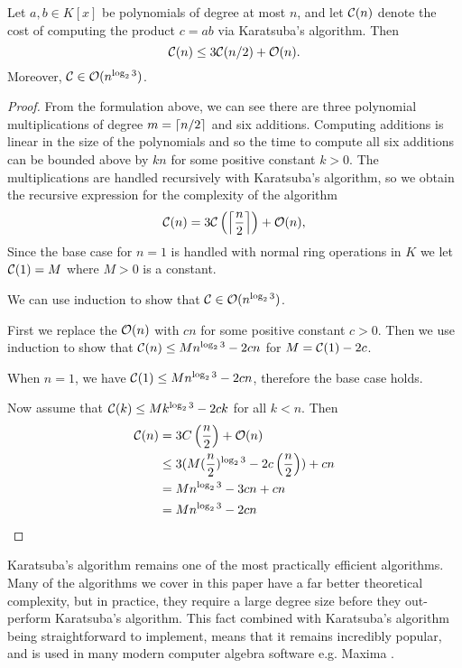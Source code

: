 \begin{theorem}
    
    Let $a, b \in K[x]$ be polynomials of degree at most $n$, and let $\mathcal C(n)$ denote the cost of computing the product $c = ab$ via Karatsuba's algorithm. Then 
    \[
        \mathcal C(n) \le 3\mathcal C(n/2) + \mathcal O(n).
    \]
    Moreover, $\mathcal C \in \mathcal O(n^{\log_2 3})$.
\end{theorem}

\begin{proof}
    From the formulation above, we can see there are three polynomial multiplications of degree $m = \left \lceil n/2 \right \rceil$ and six additions. Computing additions is linear in the size of the polynomials and so the time to compute all six additions can be bounded above by $kn$ for some positive constant $k > 0$. The multiplications are handled recursively with Karatsuba's algorithm, so we obtain the recursive expression for the complexity of the algorithm
    \[
        \mathcal C(n) = 3\mathcal C\left(\left \lceil \frac{n}{2} \right \rceil\right) + \mathcal O(n),
    \]
    Since the base case for $n = 1$ is handled with normal ring operations in $K$ we let $\mathcal C(1) = M$ where $M > 0$ is a constant.

    We can use induction to show that $\mathcal C \in \mathcal O(n^{\log_2 3})$.

    First we replace the $\mathcal O(n)$ with $cn$ for some positive constant $c > 0$. Then we use induction to show that $\mathcal C(n) \le Mn^{\log_2 3} - 2cn$ for $M = \mathcal C(1) - 2c$.

    When $n = 1$, we have $\mathcal C(1) \le Mn^{\log_2 3} - 2cn$, therefore the base case holds.

    Now assume that $\mathcal C(k) \le Mk^{\log_2 3} - 2ck$ for all $k < n$. Then 
    \begin{align*}
        \mathcal C(n) &= 3C\left(\frac{n}{2}\right) + \mathcal O(n)\\
                 &\le 3(M(\frac{n}{2})^{\log_2 3} - 2c\left(\frac{n}{2}\right)) + cn\\
                 &= Mn^{\log_2 3} - 3cn + cn\\
                 &= Mn^{\log_2 3} - 2cn
    \end{align*}
\end{proof}

\medskip

Karatsuba's algorithm remains one of the most practically efficient algorithms. Many of the algorithms we cover in this paper have a far better theoretical complexity, but in practice, they require a large degree size before they out-perform Karatsuba's algorithm. This fact combined with Karatsuba's algorithm being straightforward to implement, means that it remains incredibly popular, and is used in many modern computer algebra software e.g. Maxima \cite{maxima-karatsuba}.

